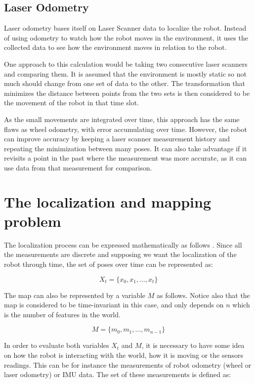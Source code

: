 \subsection{Laser Odometry}

Laser odometry bases itself on Laser Scanner data to localize the robot. Instead of using odometry to watch how the robot moves in the environment, it uses the collected data to see how the environment moves in relation to the robot.

One approach to this calculation would be taking two consecutive laser scanners and comparing them. It is assumed that the environment is mostly static so not much should change from one set of data to the other. The transformation that minimizes the distance between points from the two sets is then considered to be the movement of the robot in that time slot.

As the small movements are integrated over time, this approach has the same flaws as wheel odometry, with error accumulating over time. However, the robot can improve accuracy by keeping a laser scanner measurement history and repeating the minimization between many poses. It can also take advantage if it revisits a point in the past where the measurement was more accurate, as it can use data from that measurement for comparison.

\section{The localization and mapping problem}

The localization process can be expressed mathematically as follows \cite{thrun2005probabilistic}. Since all the measurements are discrete and supposing we want the localization of the robot through time, the set of poses over time can be represented as:

\begin{equation}\label{eq:x}
    X_t = \{x_0, x_1, \dots, x_t\} 
\end{equation}

The map can also be represented by a variable $M$ as follows. Notice also that the map is considered to be time-invariant in this case, and only depends on $n$ which is the number of features in the world.

\begin{equation}
    M = \{m_0, m_1, \dots, m_{n - 1}\}
\end{equation}

In order to evaluate both variables $X_t$ and $M$, it is necessary to have some idea on how the robot is interacting with the world, how it is moving or the sensors readings. This can be for instance the measurements of robot odometry (wheel or laser odometry) or IMU data. The set of these measurements is defined as:

